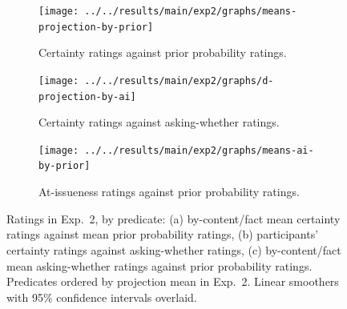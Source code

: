 \documentclass[11pt,fleqn]{article}
\newcommand{\6}{\mbox{$[\hspace*{-.6mm}[$}}
\newcommand{\9}{\mbox{$]\hspace*{-.6mm}]$}}
\begin{document}
\begin{figure}[h!]
\centering
\begin{subfigure}[t]{0.49\textwidth}
\centering
\texttt{[image: ../../results/main/exp2/graphs/means-projection-by-prior]}
\caption{Certainty ratings against prior probability ratings.}\label{fig:certainty-by-prior2}
\end{subfigure} \hfill \begin{subfigure}[t]{0.49\textwidth}
\centering
\texttt{[image: ../../results/main/exp2/graphs/d-projection-by-ai]}
\caption{Certainty ratings against asking-whether ratings.}\label{fig:certainty-by-nai2}
 \end{subfigure}
 
\begin{subfigure}[t]{0.49\textwidth}
\centering
\texttt{[image: ../../results/main/exp2/graphs/means-ai-by-prior]}
\caption{At-issueness ratings against prior probability ratings.}\label{fig:ai-by-prior2}
 \end{subfigure}
 
\caption{Ratings in Exp.~2, by predicate: (a) by-content/fact mean certainty ratings against mean prior probability ratings, (b) participants' certainty ratings against asking-whether ratings, (c) by-content/fact mean asking-whether ratings against prior probability ratings. Predicates ordered by projection mean in Exp.~2. Linear smoothers with 95\% confidence intervals overlaid.}\label{fig:results2}
\end{figure}
\end{document}
